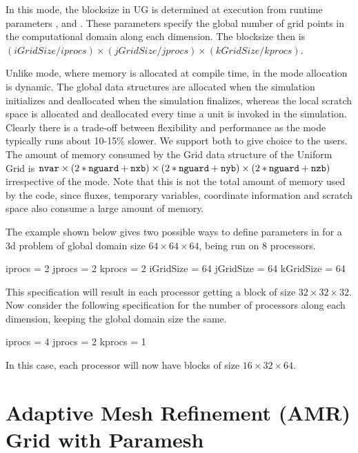 In this mode, the blocksize in UG is determined at execution
from runtime parameters ,
 and
. These parameters specify the global
number of grid points in the computational domain along each
dimension. The blocksize then is
$(iGridSize/iprocs)\times(jGridSize/jprocs)\times(kGridSize/kprocs)$.

Unlike  mode, where memory %
is allocated
at compile time, in the 
mode%
allocation is dynamic.  The global data structures are allocated when
the simulation initializes and deallocated when the simulation
finalizes, whereas the local scratch space is allocated and
deallocated every time a unit is invoked in the simulation. Clearly
there is a trade-off between flexibility and performance as the
 mode typically runs about 10-15\% slower.  We
support both to give choice to the users. The amount of memory
consumed by the Grid data structure of the Uniform Grid is
${\tt nvar} \times (2*{\tt nguard}+{\tt nxb}) \times
(2*{\tt nguard}+{\tt nyb})\times(2*{\tt nguard}+{\tt nzb})$
irrespective of the mode.  Note that this is not the total amount of
memory used by the code, since fluxes, temporary variables, coordinate
information and scratch space also consume a large amount of memory.

The example shown below gives two possible ways to define parameters
in  for a 3d problem of global domain size $64 \times
64 \times 64$, being run on 8 processors.
\begin{codeseg}
iprocs = 2
jprocs = 2
kprocs = 2
iGridSize = 64
jGridSize = 64
kGridSize = 64
\end{codeseg}
This specification will result in each processor getting a block of
size $32 \times 32 \times 32$. Now consider the following
specification for the number of processors along each dimension,
keeping the global domain size the same.
\begin{codeseg}
iprocs = 4
jprocs = 2
kprocs = 1
\end{codeseg}
In this case, each processor will now have blocks of size $ 16 \times 32 \times 64$.



\section{Adaptive Mesh Refinement (AMR) Grid with Paramesh}
\label{Sec:Grid AMR}


